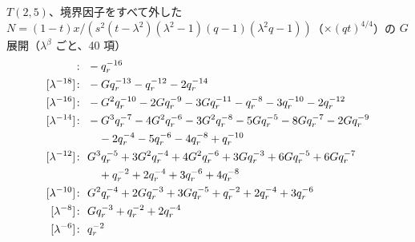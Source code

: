 $T(2,5)$、境界因子をすべて外した $N = (1-t)x/(s^2(t-\lambda^2)(\lambda^2-1)(q-1)(\lambda^2q-1))$（$\times (qt)^{4/4}$）の $G$ 展開（$\lambda^\beta$ ごと、40 項）
\begin{align*}
[\lambda^{-20}]\colon\ & -\qr^{-16} \\
[\lambda^{-18}]\colon\ & -G \qr^{-13} -\qr^{-12} -2 \qr^{-14} \\
[\lambda^{-16}]\colon\ & -G^{2} \qr^{-10} -2 G \qr^{-9} -3 G \qr^{-11} -\qr^{-8} -3 \qr^{-10} -2 \qr^{-12} \\
[\lambda^{-14}]\colon\ & -G^{3} \qr^{-7} -4 G^{2} \qr^{-6} -3 G^{2} \qr^{-8} -5 G \qr^{-5} -8 G \qr^{-7} -2 G \qr^{-9} \\
& \quad -2 \qr^{-4} -5 \qr^{-6} -4 \qr^{-8} +\qr^{-10} \\
[\lambda^{-12}]\colon\ & G^{3} \qr^{-5} +3 G^{2} \qr^{-4} +4 G^{2} \qr^{-6} +3 G \qr^{-3} +6 G \qr^{-5} +6 G \qr^{-7} \\
& \quad +\qr^{-2} +2 \qr^{-4} +3 \qr^{-6} +4 \qr^{-8} \\
[\lambda^{-10}]\colon\ & G^{2} \qr^{-4} +2 G \qr^{-3} +3 G \qr^{-5} +\qr^{-2} +2 \qr^{-4} +3 \qr^{-6} \\
[\lambda^{-8}]\colon\ & G \qr^{-3} +\qr^{-2} +2 \qr^{-4} \\
[\lambda^{-6}]\colon\ & \qr^{-2}
\end{align*}

